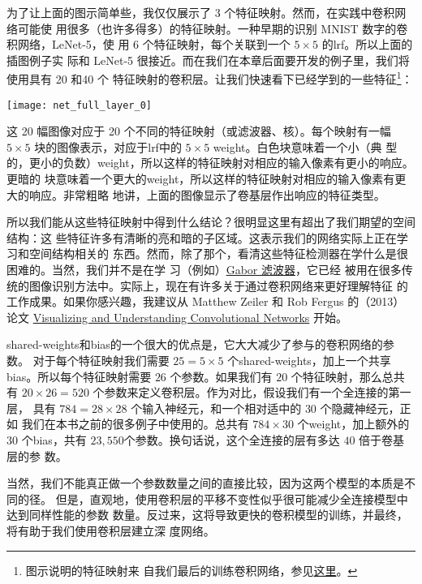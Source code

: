为了让上面的图示简单些，我仅仅展示了 3 个特征映射。然而，在实践中卷积网络可能使
用很多（也许多得多）的特征映射。一种早期的识别 MNIST 数字的卷积网络，LeNet-5，使
用 6 个特征映射，每个关联到一个 $5 \times 5$ 的\gls*{lrf}。所以上面的插图例子实
际和 LeNet-5 很接近。而在我们在本章后面要开发的例子里，我们将使用具有 20 和40 个
特征映射的卷积层。让我们快速看下已经学到的一些特征\footnote{图示说明的特征映射来
  自我们最后的训练卷积网络，参见\hyperref[final_conv]{这里}。}：
\begin{center}
  \texttt{[image: net\_full\_layer\_0]}
\end{center}

这 20 幅图像对应于 20 个不同的特征映射（或滤波器、核）。每个映射有一幅 $5 \times
5$ 块的图像表示，对应于\gls*{lrf}中的 $5 \times 5$ \gls*{weight}。白色块意味着一个小（典
  型的，更小的负数）\gls*{weight}，所以这样的特征映射对相应的输入像素有更小的响应。更暗的
块意味着一个更大的\gls*{weight}，所以这样的特征映射对相应的输入像素有更大的响应。非常粗略
地讲，上面的图像显示了卷基层作出响应的特征类型。

所以我们能从这些特征映射中得到什么结论？很明显这里有超出了我们期望的空间结构：这
些特征许多有清晰的亮和暗的子区域。这表示我们的网络实际上正在学习和空间结构相关的
东西。然而，除了那个，看清这些特征检测器在学什么是很困难的。当然，我们并不是在学
习（例如）\href{http://en.wikipedia.org/wiki/Gabor_filter}{Gabor 滤波器}，它已经
被用在很多传统的图像识别方法中。实际上，现在有许多关于通过卷积网络来更好理解特征
的工作成果。如果你感兴趣，我建议从 Matthew Zeiler 和 Rob Fergus 的（2013）论文
\href{http://arxiv.org/abs/1311.2901}{Visualizing and Understanding
  Convolutional Networks} 开始。

\gls*{shared-weights}和\gls*{bias}的一个很大的优点是，它大大减少了参与的卷积网络的参数。
对于每个特征映射我们需要 $25 = 5 \times 5$ 个\gls*{shared-weights}，加上一个共享
\gls*{bias}。所以每个特征映射需要 $26$ 个参数。如果我们有 $20$ 个特征映射，那么总共有
$20 \times 26 = 520$ 个参数来定义卷积层。作为对比，假设我们有一个全连接的第一层，
具有 $784 = 28 \times 28$ 个输入神经元，和一个相对适中的 $30$ 个隐藏神经元，正如
我们在本书之前的很多例子中使用的。总共有 $784 \times 30$ 个\gls*{weight}，加上额外的 $30$
个\gls*{bias}，共有 $23,550$个参数。换句话说，这个全连接的层有多达 $40$ 倍于卷基层的参
数。

当然，我们不能真正做一个参数数量之间的直接比较，因为这两个模型的本质是不同的径。
但是，直观地，使用卷积层的平移不变性似乎很可能减少全连接模型中达到同样性能的参数
数量。反过来，这将导致更快的卷积模型的训练，并最终，将有助于我们使用卷积层建立深
度网络。

